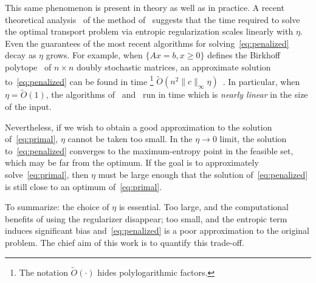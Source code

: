 \documentclass[final,12pt]{colt2018}
\newcommand{\1}{\mathds{1}}
\begin{document}
This same phenomenon is present in theory as well as in practice.
A recent theoretical analysis~\citep{AltWeeRig17} of the method of~\citet{Cut13} suggests that the time required to solve the optimal transport problem via entropic regularization scales linearly with $\eta$.
Even the guarantees of the most recent algorithms for solving~\eqref{eq:penalized} decay as $\eta$ grows.
For example, when $\{Ax = b, x \geq 0\}$ defines the Birkhoff polytope~\citep{Bru06} of $n \times n$ doubly stochastic matrices, an approximate solution to~\eqref{eq:penalized} can be found in time%
\footnote{The notation $\tilde O(\cdot)$ hides polylogarithmic factors.}
$\tilde O(n^2 \|c\|_\infty \eta)$~\citep{CohMadTsi17,AllLiOli17}.
In particular, when $\eta = \tilde O(1)$, the algorithms of~\citet{CohMadTsi17} and~\citet{AllLiOli17} run in time which is \emph{nearly linear} in the size of the input.

Nevertheless, if we wish to obtain a good approximation to the solution of~\eqref{eq:primal}, $\eta$ cannot be taken too small.
In the $\eta \to 0$ limit, the solution to~\eqref{eq:penalized} converges to the maximum-entropy point in the feasible set, which may be far from the optimum.
If the goal is to approximately solve~\eqref{eq:primal}, then $\eta$ must be large enough that the solution of~\eqref{eq:penalized} is still close to an optimum of~\eqref{eq:primal}.

To summarize: the choice of $\eta$ is essential.
Too large, and the computational benefits of using the regularizer disappear;
too small, and the entropic term induces significant bias and~\eqref{eq:penalized} is a poor approximation to the original problem.
The chief aim of this work is to quantify this trade-off.
\end{document}
